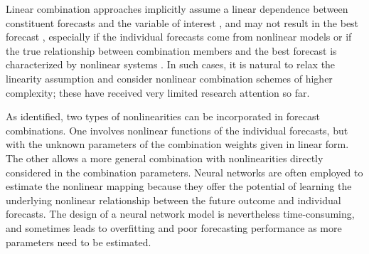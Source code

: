 \documentclass[a4paper,11pt]{article}
\begin{document}
Linear combination approaches implicitly assume a linear dependence between constituent forecasts and the variable of interest \citep{Donaldson1996-um,Freitas2006-fn}, and may not result in the best forecast \citep{Ming_Shi1999-vs}, especially if the individual forecasts come from nonlinear models or if the true relationship between combination members and the best forecast is characterized by nonlinear systems \citep{Babikir2016-xz}. In such cases, it is natural to relax the linearity assumption and consider nonlinear combination schemes of higher complexity; these have received very limited research attention so far.

As \citet{Timmermann2006-en} identified, two types of nonlinearities can be incorporated in forecast combinations. One involves nonlinear functions of the individual forecasts, but with the unknown parameters of the combination weights given in linear form. The other allows a more general combination with nonlinearities directly considered in the combination parameters. Neural networks are often employed to estimate the nonlinear mapping because they offer the potential of learning the underlying nonlinear relationship between the future outcome and individual forecasts. The design of a neural network model is nevertheless time-consuming, and sometimes leads to overfitting and poor forecasting performance as more parameters need to be estimated.
\end{document}
